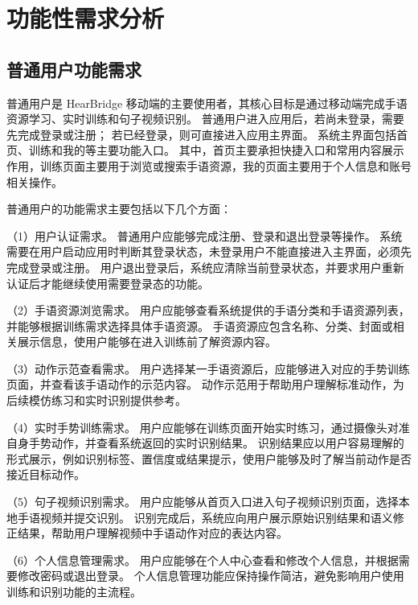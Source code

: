 
\section{功能性需求分析}

\subsection{普通用户功能需求}

普通用户是 HearBridge 移动端的主要使用者，其核心目标是通过移动端完成手语资源学习、实时训练和句子视频识别。
普通用户进入应用后，若尚未登录，需要先完成登录或注册；
若已经登录，则可直接进入应用主界面。
系统主界面包括首页、训练和我的等主要功能入口。
其中，首页主要承担快捷入口和常用内容展示作用，训练页面主要用于浏览或搜索手语资源，我的页面主要用于个人信息和账号相关操作。

普通用户的功能需求主要包括以下几个方面：

（1）用户认证需求。
普通用户应能够完成注册、登录和退出登录等操作。
系统需要在用户启动应用时判断其登录状态，未登录用户不能直接进入主界面，必须先完成登录或注册。
用户退出登录后，系统应清除当前登录状态，并要求用户重新认证后才能继续使用需要登录态的功能。

（2）手语资源浏览需求。
用户应能够查看系统提供的手语分类和手语资源列表，并能够根据训练需求选择具体手语资源。
手语资源应包含名称、分类、封面或相关展示信息，使用户能够在进入训练前了解资源内容。

（3）动作示范查看需求。
用户选择某一手语资源后，应能够进入对应的手势训练页面，并查看该手语动作的示范内容。
动作示范用于帮助用户理解标准动作，为后续模仿练习和实时识别提供参考。

（4）实时手势训练需求。
用户应能够在训练页面开始实时练习，通过摄像头对准自身手势动作，并查看系统返回的实时识别结果。
识别结果应以用户容易理解的形式展示，例如识别标签、置信度或结果提示，使用户能够及时了解当前动作是否接近目标动作。

（5）句子视频识别需求。
用户应能够从首页入口进入句子视频识别页面，选择本地手语视频并提交识别。
识别完成后，系统应向用户展示原始识别结果和语义修正结果，帮助用户理解视频中手语动作对应的表达内容。

（6）个人信息管理需求。
用户应能够在个人中心查看和修改个人信息，并根据需要修改密码或退出登录。
个人信息管理功能应保持操作简洁，避免影响用户使用训练和识别功能的主流程。


